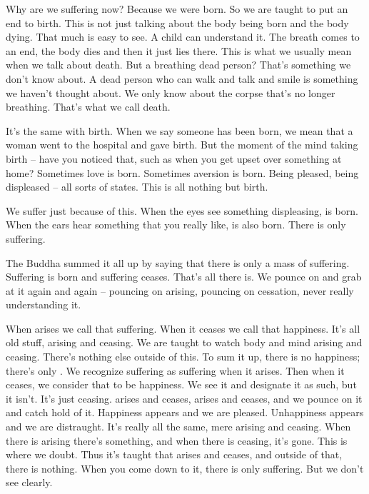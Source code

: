 Why are we suffering now? Because we were born. So we are taught to put an end to birth. This is not just talking about the body being born and the body dying. That much is easy to see. A child can understand it. The breath comes to an end, the body dies and then it just lies there. This is what we usually mean when we talk about death. But a breathing dead person? That's something we don't know about. A dead person who can walk and talk and smile is something we haven't thought about. We only know about the corpse that's no longer breathing. That's what we call death.

It's the same with birth. When we say someone has been born, we mean that a woman went to the hospital and gave birth. But the moment of the mind taking birth -- have you noticed that, such as when you get upset over something at home? Sometimes love is born. Sometimes aversion is born. Being pleased, being displeased -- all sorts of states. This is all nothing but birth.

We suffer just because of this. When the eyes see something displeasing,  is born. When the ears hear something that you really like,  is also born. There is only suffering.

The Buddha summed it all up by saying that there is only a mass of suffering. Suffering is born and suffering ceases. That's all there is. We pounce on and grab at it again and again -- pouncing on arising, pouncing on cessation, never really understanding it.

When  arises we call that suffering. When it ceases we call that happiness. It's all old stuff, arising and ceasing. We are taught to watch body and mind arising and ceasing. There's nothing else outside of this. To sum it up, there is no happiness; there's only . We recognize suffering as suffering when it arises. Then when it ceases, we consider that to be happiness. We see it and designate it as such, but it isn't. It's just  ceasing.  arises and ceases, arises and ceases, and we pounce on it and catch hold of it. Happiness appears and we are pleased. Unhappiness appears and we are distraught. It's really all the same, mere arising and ceasing. When there is arising there's something, and when there is ceasing, it's gone. This is where we doubt. Thus it's taught that  arises and ceases, and outside of that, there is nothing. When you come down to it, there is only suffering. But we don't see clearly.

